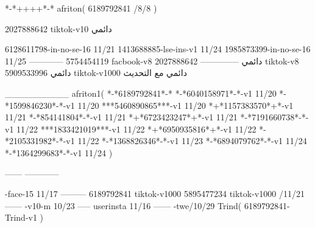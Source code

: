 *-*++++*-*
afriton(
6189792841 /8/8
)

2027888642 tiktok-v10
دائمي

6128611798-in-no-se-16 11/21
1413688885-lse-ins-v1 11/24
1985873399-in-no-se-16 11/25
------------
5754454119 facbook-v8
دائمي
--------------
2027888642 tiktok-v8
دائمي
5909533996 tiktok-v1000
دائمي مع التحديث

__________
afriton1(
*-*6189792841*-*
*-*6040158971*-*-v1 11/20
*-*1599846230*-*-v1 11/20
***5460890865***-v1 11/20
*+*1157383570*+*-v1 11/21
*-*854141804*-*-v1 11/21
*+*6723423247*+*-v1 11/21
*-*7191660738*-*-v1 11/22
***1833421019***-v1 11/22
*+*6950935816*+*-v1 11/22
*-*2105331982*-*-v1 11/22
*-*1368826346*-*-v1 11/23
*-*6894079762*-*-v1 11/24
*-*1364299683*-*-v1 11/24
)

------
------------

-face-15 11/17
---------
6189792841 tiktok-v1000
5895477234 tiktok-v1000 /11/21
------
-v10-m 10/23
-----
userinsta 11/16
------
-twe/10/29
Trind(
6189792841-Trind-v1 
)
